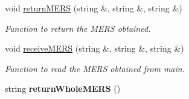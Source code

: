 \begin{DoxyCompactItemize}
\item 
\hypertarget{class_calculation_ac3113f77c5333c89ecf635dbf8c59821}{void \hyperlink{class_calculation_ac3113f77c5333c89ecf635dbf8c59821}{return\+M\+E\+R\+S} (string \&, string \&, string \&)}\label{class_calculation_ac3113f77c5333c89ecf635dbf8c59821}

\begin{DoxyCompactList}\small\item\em Function to return the M\+E\+R\+S obtained. \end{DoxyCompactList}\item 
\hypertarget{class_calculation_adaca33bdcb3c7f0a91ea6cbd58a569f6}{void \hyperlink{class_calculation_adaca33bdcb3c7f0a91ea6cbd58a569f6}{receive\+M\+E\+R\+S} (string \&, string \&, string \&)}\label{class_calculation_adaca33bdcb3c7f0a91ea6cbd58a569f6}

\begin{DoxyCompactList}\small\item\em Function to read the M\+E\+R\+S obtained from main. \end{DoxyCompactList}\item 
\hypertarget{class_calculation_a867b843b41f6fb286bd44d848ad0b4fe}{string {\bfseries return\+Whole\+M\+E\+R\+S} ()}\label{class_calculation_a867b843b41f6fb286bd44d848ad0b4fe}

\end{DoxyCompactItemize}
